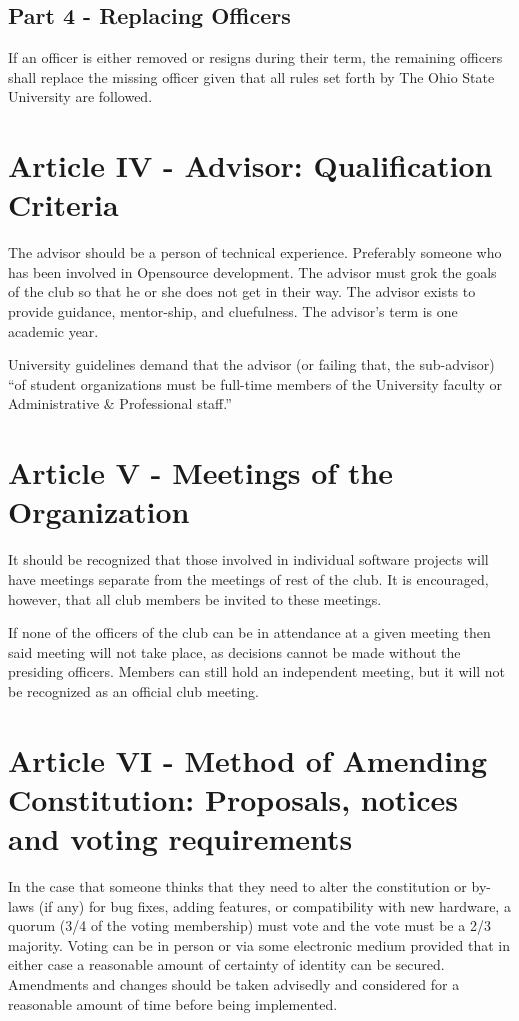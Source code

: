\documentclass{article}
\begin{document}
	\subsection{Part 4 - Replacing Officers}

	If an officer is either removed or resigns during their term, the remaining officers shall replace the missing officer given that all rules set forth by The Ohio State University are followed.

	\section{Article IV - Advisor: Qualification Criteria}

	The advisor should be a person of technical experience. Preferably someone who has been involved in Opensource development. The advisor must grok the goals of the club so that he or she does not get in their way. The advisor exists to provide guidance, mentor-ship, and cluefulness. The advisor's term is one academic year.

	University guidelines demand that the advisor (or failing that, the sub-advisor) ``of student organizations must be full-time members of the University faculty or Administrative \& Professional staff.''

	\section{Article V - Meetings of the Organization}

	It should be recognized that those involved in individual software projects will have meetings separate from the meetings of rest of the club. It is encouraged, however, that all club members be invited to these meetings.

	If none of the officers of the club can be in attendance at a given meeting then said meeting will not take place, as decisions cannot be made without the presiding officers. Members can still hold an independent meeting, but it will not be recognized as an official club meeting.

	\section{Article VI - Method of Amending Constitution: Proposals, notices and voting requirements}

	In the case that someone thinks that they need to alter the constitution or by-laws (if any) for bug fixes, adding features, or compatibility with new hardware, a quorum (3/4 of the voting membership) must vote and the vote must be a 2/3 majority. Voting can be in person or via some electronic medium provided that in either case a reasonable amount of certainty of identity can be secured. Amendments and changes should be taken advisedly and considered for a reasonable amount of time before being implemented.
\end{document}
